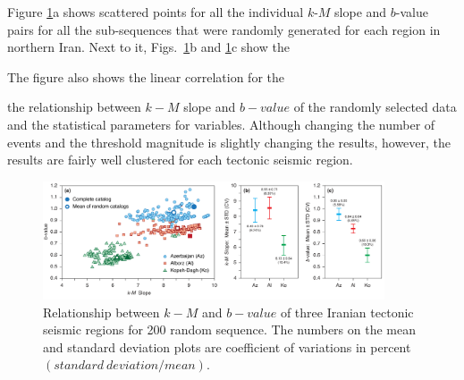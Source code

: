 Figure \ref{fig:random}a shows scattered points for all the individual $k$-$M$ slope and $b$-value pairs for all the sub-sequences that were randomly generated for each region in northern Iran. Next to it, Figs.~\ref{fig:random}b and \ref{fig:random}c show the 

The figure also shows the linear correlation for the 

the relationship between  $k-M$  slope and  $b-value$  of the randomly selected data and the statistical parameters for variables. Although changing the number of events and the threshold magnitude is slightly changing the results, however,  the results are fairly well clustered for each tectonic seismic region. 




   

\begin{figure}%
	\centering
	\includegraphics[width=0.9\textwidth]{figures/pdf/figure-08} 
	\caption{Relationship between $k-M$ and $b-value$ of three Iranian tectonic seismic regions for 200 random sequence. The numbers on the mean and standard deviation plots are coefficient of variations in percent $(standard \ deviation / mean)$.}
	\label{fig:random}
\end{figure}

